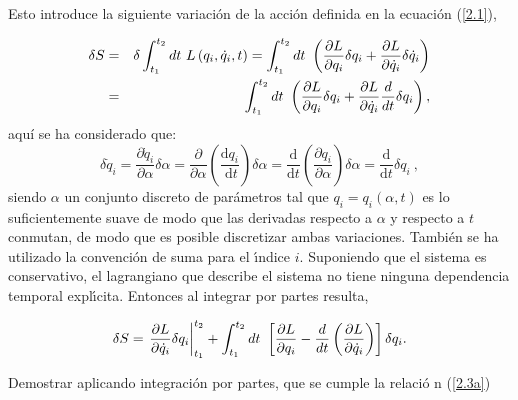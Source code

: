 Esto introduce la siguiente variaci\'{o}n de la acci\'{o}n definida en la
ecuaci\'{o}n (\ref{2.1}),

\begin{eqnarray}
\delta S &=&\delta \int_{t_{1}}^{t_{2}}dt\ L\left( q_{i},\dot{q}%
_{i},t\right) =\int_{t_{1}}^{t_{2}}dt\ \left( \frac{\partial L}{\partial
q_{i}}\delta q_{i}+\frac{\partial L}{\partial \dot{q}_{i}}\delta \dot{q}%
_{i}\right)   \notag \\
&=&\int_{t_{1}}^{t_{2}}dt\ \left( \frac{\partial L}{\partial q_{i}}\delta
q_{i}+\frac{\partial L}{\partial \dot{q}_{i}} \frac{d}{dt}\delta q_{i} \right)
,  \label{2.3}
\end{eqnarray}
aquí se ha considerado que:
\begin{equation}
\delta \dot{q}_{i}=\frac{\partial \dot{q}_{i}}{\partial \alpha} \delta \alpha=\frac{\partial}{\partial \alpha}\left(\frac{\mathrm{d} q_{i}}{\mathrm{~d} t}\right) \delta \alpha=\frac{\mathrm{d}}{\mathrm{d} t}\left(\frac{\partial q_{i}}{\partial \alpha}\right) \delta \alpha=\frac{\mathrm{d}}{\mathrm{d} t} \delta q_{i}~,
\end{equation}
siendo $\alpha$ un conjunto discreto de parámetros tal que $q_{i}= q_{i}(\alpha,t)$ es lo suficientemente suave de modo que las derivadas respecto a $\alpha$ y respecto a $t$ conmutan, de modo que es posible discretizar ambas variaciones. También se ha utilizado la convenci\'{o}n de suma para el \'{\i}ndice $i$. Suponiendo que el sistema es conservativo, el lagrangiano que describe el sistema no tiene ninguna dependencia temporal expl\'{\i}cita. Entonces al integrar por partes resulta,

\begin{equation}
\delta S=\left. \frac{\partial L}{\partial \dot{q}_{i}}\delta
q_{i}\right\vert _{t_{1}}^{t_{2}}+\int_{t_{1}}^{t_{2}}dt\ \left[ \frac{%
\partial L}{\partial q_{i}}-\frac{d}{dt}\left( \frac{\partial L}{\partial 
\dot{q}_{i}}\right) \right] \delta q_{i}  \label{2.3a}.
\end{equation}

\begin{exercise}
Demostrar aplicando integraci\'{o}n por partes, que se cumple la relaci\'{o}%
n (\ref{2.3a})
\end{exercise}

